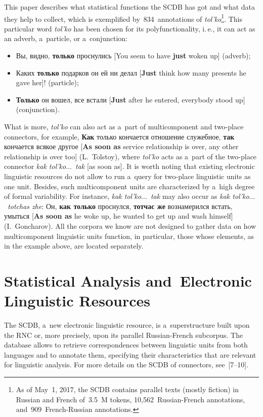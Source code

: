\begin{multicols}{2}
  This paper describes what statistical functions the SCDB has got and what data 
they help to collect, which is exemplified by~834~annotations of 
\textit{tol'ko}\footnote{As of May~1, 2017, the SCDB contains parallel texts (mostly
 fiction) in 
Russian and French of~3.5~M tokens, 10,562~Russian-French annotations,
 and~909~French-Russian 
annotations.}. This particular word \textit{tol'ko} has been chosen for its 
polyfunctionality, i.\,e., it can act as an adverb, a~particle, or a~conjunction:
  \begin{itemize}
  \item Вы, видно, \textbf{только} проснулись [You seem to have \textbf{just} 
woken up] (adverb);
  \item  Каких \textbf{только} подарков он ей ни делал [\textbf{Just} think 
how many presents he gave her]! (particle);
  \item  \textbf{Только} он вошел, все встали [\textbf{Just} after he entered, 
everybody stood up] (conjunction).
  \end{itemize}
  
  What is more, \textit{tol'ko} can also act as a~part of multicomponent and  
two-place connectors, for example, \textbf{Как} только кончается отношение 
служебное, \textbf{так} кончается всякое другое [\textbf{As soon as} service 
relationship is over, any other relationship is over too] (L.~Tolstoy), where 
\textit{tol'ko} acts as a~part of the two-place connector \textit{kak tol'ko$\ldots$\ 
tak} [as soon as]. It is worth noting that existing electronic linguistic resources do 
not allow to run a~query for two-place linguistic units as one unit. Besides, such 
multicomponent units are characterized by a~high degree of formal variability. For 
instance, \textit{kak tol'ko$\ldots$\ tak} may also occur as \textit{kak 
tol'ko$\ldots$\ totchas zhe}: Он, \textbf{как только} проснулся, \textbf{тотчас же}
вознамерился встать, умыться 
[\textbf{As soon as} he woke up, he wanted to get up and wash 
himself] (I.~Goncharov). All the corpora we know are not designed to gather 
data on how multicomponent linguistic units function, in particular, those whose 
elements, as in the example above, are located separately.

\section{Statistical Analysis and~Electronic Linguistic Resources}

  \noindent
  The SCDB, a~new electronic linguistic resource, is a~superstructure built upon 
the RNC or, more precisely, upon its parallel Russian-French subcorpus. The 
database allows to retrieve correspondences between linguistic units from both 
languages and to annotate them, specifying their characteristics that are relevant 
for linguistic analysis. For more details on the SCDB of connectors, see~[7--10].
  

\end{multicols}
